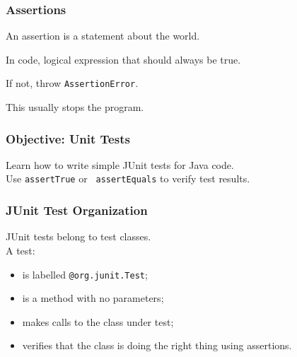 \begin{frame}
\frametitle{Assertions}
\begin{changemargin}{1cm}

An assertion is a statement about the world.

In code, logical expression that should always be true.

If not, throw \texttt{AssertionError}.

This usually stops the program. 

\end{changemargin}

\end{frame}



\begin{frame}
\frametitle{Objective: Unit Tests}

\begin{changemargin}{1.5cm}

Learn how to write simple JUnit 
tests for Java code.\\[1em]

Use {\tt assertTrue} or {\tt
  assertEquals} to verify test results.
\end{changemargin}

\end{frame}

\begin{frame}
\frametitle{JUnit Test Organization}

\large
\begin{changemargin}{1cm}
JUnit tests belong to test classes.\\[1em]

A test:
\begin{itemize}
\item is labelled {\tt @org.junit.Test};
\item is a method with no parameters;
\item makes calls to the class under test;
\item verifies that the class is doing the right thing using assertions.
\end{itemize}

\end{changemargin}
\end{frame}

